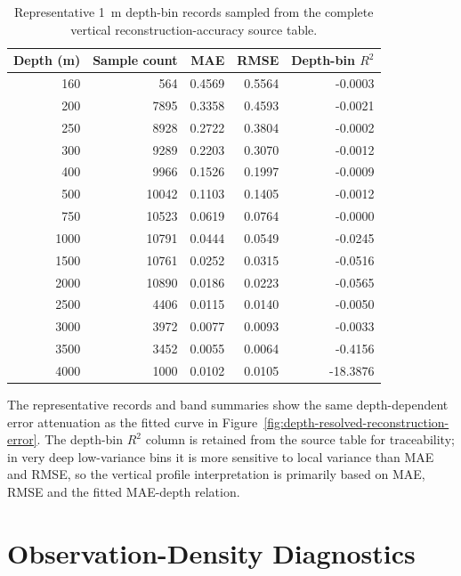 \documentclass[10pt]{article}
\begin{document}
\clearpage
\begin{table}[htbp]
\centering
\caption{Representative 1~m depth-bin records sampled from the complete vertical reconstruction-accuracy source table.}
\label{tab:depth-accuracy-representative-records}
\small
\setlength{\tabcolsep}{5pt}
\renewcommand{\arraystretch}{1.08}
\begin{tabular}{rrrrr}
\toprule
Depth (m) & Sample count & MAE & RMSE & Depth-bin $R^2$ \\
\midrule
160 & 564 & 0.4569 & 0.5564 & -0.0003 \\
200 & 7895 & 0.3358 & 0.4593 & -0.0021 \\
250 & 8928 & 0.2722 & 0.3804 & -0.0002 \\
300 & 9289 & 0.2203 & 0.3070 & -0.0012 \\
400 & 9966 & 0.1526 & 0.1997 & -0.0009 \\
500 & 10042 & 0.1103 & 0.1405 & -0.0012 \\
750 & 10523 & 0.0619 & 0.0764 & -0.0000 \\
1000 & 10791 & 0.0444 & 0.0549 & -0.0245 \\
1500 & 10761 & 0.0252 & 0.0315 & -0.0516 \\
2000 & 10890 & 0.0186 & 0.0223 & -0.0565 \\
2500 & 4406 & 0.0115 & 0.0140 & -0.0050 \\
3000 & 3972 & 0.0077 & 0.0093 & -0.0033 \\
3500 & 3452 & 0.0055 & 0.0064 & -0.4156 \\
4000 & 1000 & 0.0102 & 0.0105 & -18.3876 \\
\bottomrule
\end{tabular}
\end{table}

\noindent
The representative records and band summaries show the same depth-dependent error attenuation as the fitted curve in Figure~\ref{fig:depth-resolved-reconstruction-error}.
The depth-bin $R^2$ column is retained from the source table for traceability; in very deep low-variance bins it is more sensitive to local variance than MAE and RMSE, so the vertical profile interpretation is primarily based on MAE, RMSE and the fitted MAE-depth relation.

\clearpage


\clearpage
\section{Observation-Density Diagnostics}
\label{sec:observation-density-diagnostics}
\end{document}
